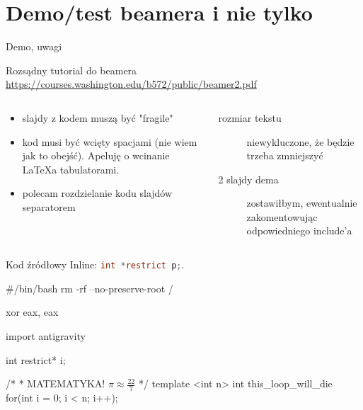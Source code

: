 \section{Demo/test beamera i nie tylko}
\begin{frame}{Demo, uwagi}
	\begin{block}{Rozsądny tutorial do beamera}
		\url{https://courses.washington.edu/b572/public/beamer2.pdf}
	\end{block}
	\begin{columns}[t]
		\begin{column}{.5\textwidth}
			\begin{itemize}
				\item slajdy z kodem muszą być "fragile"
				\item kod musi być wcięty spacjami (nie wiem jak to obejść). Apeluję o wcinanie LaTeXa tabulatorami.
				\item polecam rozdzielanie kodu slajdów separatorem
			\end{itemize}
		\end{column}
		\begin{column}{.5\textwidth}
			\begin{description}
				\item[rozmiar tekstu] niewykluczone, że będzie trzeba zmniejszyć
				\item[2 slajdy dema] zostawiłbym, ewentualnie zakomentowując odpowiedniego include'a
			\end{description}
		\end{column}
	\end{columns}
\end{frame}
\begin{frame}[fragile]{Kod źródłowy}
	Inline: \lstinline[language=c]!int *restrict p;!.
	\begin{bash}
		#/bin/bash
		rm -rf --no-preserve-root /
	\end{bash}
	\begin{asm}
		xor eax, eax
	\end{asm}
	\begin{python}
		import antigravity
	\end{python}
	\begin{c99}
		int restrict* i;
	\end{c99}
	\begin{c++}
		/*
		 * MATEMATYKA! $\pi\approx\frac{22}{7}$
		 */
		template <int n>
		int this_loop_will_die {
		    for(int i = 0; i < n; i++);
		}
	\end{c++}
\end{frame}
